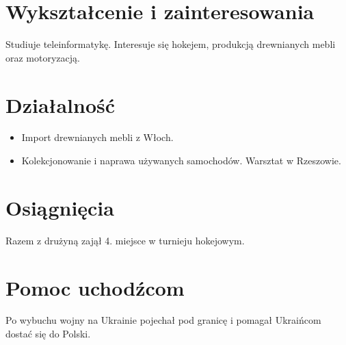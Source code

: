 \section*{Wykształcenie i zainteresowania}
Studiuje teleinformatykę. Interesuje się hokejem, produkcją drewnianych mebli oraz motoryzacją.
\section*{Działalność}
\begin{itemize}
\item Import drewnianych mebli z Włoch.
\item Kolekcjonowanie i naprawa używanych samochodów. Warsztat w Rzeszowie.
\end{itemize}
\section*{Osiągnięcia}
Razem z drużyną zajął 4. miejsce w turnieju hokejowym.
\section*{Pomoc uchodźcom}
Po wybuchu wojny na Ukrainie pojechał pod granicę i pomagał Ukraińcom dostać się do Polski.